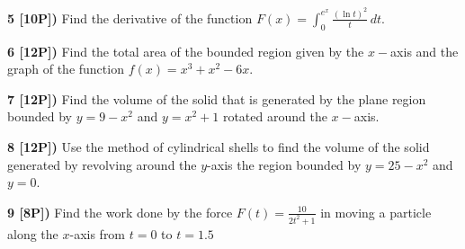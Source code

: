 \documentclass[12pt]{article}
\begin{document}
\vspace{.35in}

{\bf 5 [10P])} Find the derivative of the function
${\displaystyle F(x) = \int_0^{e^x} \frac{ ( \ln t)^2}{t}\, dt}$.

\vspace{.35in}

{\bf 6 [12P])} Find the total area of the bounded region given by the
${\displaystyle x-}$axis and the graph of the function
${\displaystyle f(x) = x^3 + x^2 - 6x }$.

\vspace{.35in}
 
{\bf 7 [12P])} Find the volume of the solid that is generated by the plane region bounded by
${\displaystyle y = 9 - x^2 }$ and ${\displaystyle y = x^2 + 1}$ rotated
around the ${\displaystyle x-}$axis.

\vspace{.35in}

{\bf 8 [12P])} Use the method of cylindrical shells to find
the volume of the solid generated by revolving around the
$y$-axis the region bounded by $y= 25 - x^2$ and
$y = 0$.
\\ %




\vspace{.35in}

{\bf 9 [8P])} Find the work done by the force $
F(t) = \frac{10}{2t^2+1}$
in moving a particle along the $x$-axis from $t=0$ to $t=1.5$

\end{document}
